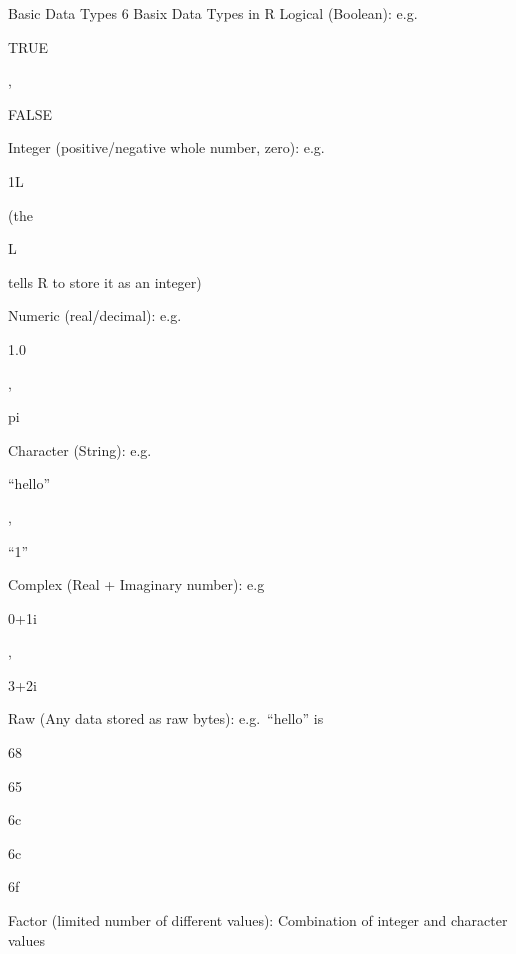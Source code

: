 \documentclass[
  ignorenonframetext,
]{beamer}
\begin{document}
\begin{frame}{Basic Data Types \textbar{} 6 Basix Data Types in R}
\protect\hypertarget{basic-data-types-6-basix-data-types-in-r}{}
Logical (Boolean): e.g.~

TRUE

,

FALSE

Integer (positive/negative whole number, zero): e.g.~

1L

(the

L

tells R to store it as an integer)

Numeric (real/decimal): e.g.~

1.0

,

pi

Character (String): e.g.~

``hello''

,

``1''

Complex (Real + Imaginary number): e.g

0+1i

,

3+2i

Raw (Any data stored as raw bytes): e.g.~``hello'' is

68

65

6c

6c

6f

Factor (limited number of different values): Combination of integer and
character values
\end{frame}
\end{document}
